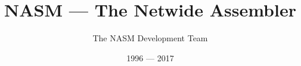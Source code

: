 \documentclass[oneside,openany]{book}
\begin{document}
\title{NASM --- The Netwide Assembler}
\date{1996 --- 2017}
\author{The NASM Development Team}

\maketitle
\tableofcontents
{}

%




\printindex
\end{document}

